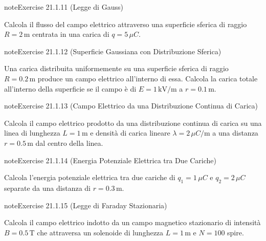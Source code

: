 \documentclass[letterpaper,10pt,italian]{jupyterBook}
\begin{document}
\begin{sphinxadmonition}{note}{Exercise 21.1.11 (Legge di Gauss)}



\sphinxAtStartPar
Calcola il flusso del campo elettrico attraverso una superficie sferica di raggio \(R = 2 \, \text{m}\) centrata in una carica di \(q = 5 \, \mu C\).
\end{sphinxadmonition}
 \label{exercise:ch/electromagnetism/electrostatics-problems-exercise-11}

\begin{sphinxadmonition}{note}{Exercise 21.1.12 (Superficie Gaussiana con Distribuzione Sferica)}



\sphinxAtStartPar
Una carica distribuita uniformemente su una superficie sferica di raggio \(R = 0.2 \, \text{m}\) produce un campo elettrico all’interno di essa. Calcola la carica totale all’interno della superficie se il campo è di \(E = 1 \, \text{kV/m}\) a \(r = 0.1 \, \text{m}\).
\end{sphinxadmonition}
 \label{exercise:ch/electromagnetism/electrostatics-problems-exercise-12}

\begin{sphinxadmonition}{note}{Exercise 21.1.13 (Campo Elettrico da una Distribuzione Continua di Carica)}



\sphinxAtStartPar
Calcola il campo elettrico prodotto da una distribuzione continua di carica su una linea di lunghezza \(L = 1 \, \text{m}\) e densità di carica lineare \(\lambda = 2 \, \mu C/\text{m}\) a una distanza \(r = 0.5 \, \text{m}\) dal centro della linea.
\end{sphinxadmonition}
 \label{exercise:ch/electromagnetism/electrostatics-problems-exercise-13}

\begin{sphinxadmonition}{note}{Exercise 21.1.14 (Energia Potenziale Elettrica tra Due Cariche)}



\sphinxAtStartPar
Calcola l’energia potenziale elettrica tra due cariche di \(q_1 = 1 \, \mu C\) e \(q_2 = 2 \, \mu C\) separate da una distanza di \(r = 0.3 \, \text{m}\).
\end{sphinxadmonition}
 \label{exercise:ch/electromagnetism/electrostatics-problems-exercise-14}

\begin{sphinxadmonition}{note}{Exercise 21.1.15 (Legge di Faraday Stazionaria)}



\sphinxAtStartPar
Calcola il campo elettrico indotto da un campo magnetico stazionario di intensità \(B = 0.5 \, \text{T}\) che attraversa un solenoide di lunghezza \(L = 1 \, \text{m}\) e \(N = 100\) spire.
\end{sphinxadmonition}
 \label{exercise:ch/electromagnetism/electrostatics-problems-exercise-15}
\end{document}
